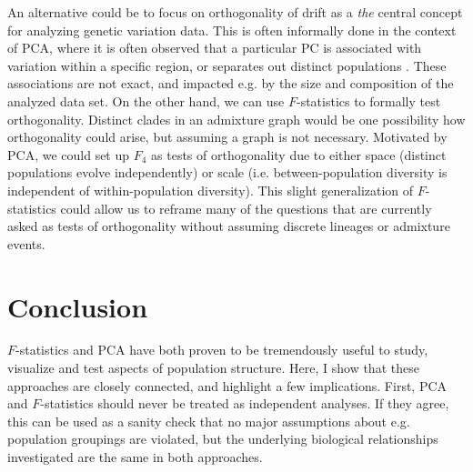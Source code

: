 \documentclass[12pt,fullpage, a4paper]{article}
\begin{document}

An alternative could be to focus on orthogonality of drift as a \emph{the} central concept for analyzing genetic variation data.
This is often informally done in the context of PCA, where it is often observed that a particular PC is associated with variation within a specific region, or separates out distinct populations \citep{cavalli-sforza1994}. These associations are not exact, and impacted e.g. by the size and composition of the analyzed data set. On the other hand, we can use $F$-statistics to formally test orthogonality. Distinct clades in an admixture graph would be one possibility how orthogonality could arise, but assuming a graph is not necessary. Motivated by PCA, we could set up $F_4$ as tests of orthogonality due to either space (distinct populations evolve independently) or scale (i.e. between-population diversity is independent of within-population diversity). This slight generalization of $F$-statistics could allow us to reframe many of the questions that are currently asked as tests of orthogonality without assuming discrete lineages or admixture events.

\section{Conclusion}
$F$-statistics and PCA have both proven to be tremendously useful to study, visualize and test aspects of population structure. Here, I show that these approaches are closely connected, and highlight a few implications. First, PCA and $F$-statistics should never be treated as independent analyses. If they agree, this can be used as a sanity check that no major assumptions about e.g. population groupings are violated, but the underlying biological relationships investigated are the same in both approaches.  
\end{document}
